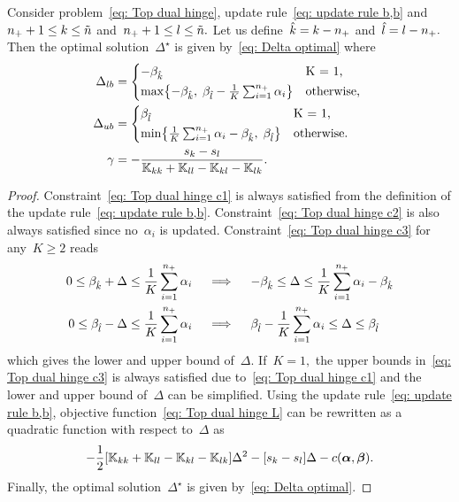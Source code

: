 \begin{lemma}
  Consider problem~\eqref{eq: Top dual hinge}, update rule~\eqref{eq: update rule b,b} and~$n_{+} + 1 \leq k \leq \tilde{n}$ and~$n_{+} + 1 \leq l \leq \tilde{n}.$ Let us define~$\hat{k} = k - n_{+}$ and~$\hat{l} = l - n_{+}.$ Then the optimal solution~$\Delta^{\star}$ is given by~\eqref{eq: Delta optimal} where
  \begin{align*}
    \Delta_{lb} & = 
      \begin{cases*}
        - \betak & K = 1, \\
        \max \Brac[c]{- \betak,\; \betal - \frac{1}{K} \sum_{i = 1}^{\npos} \alpha_i} & \textrm{otherwise},
      \end{cases*} \\
    \Delta_{ub} & = 
      \begin{cases*}
        \betal & K = 1, \\
        \min \Brac[c]{\frac{1}{K} \sum_{i = 1}^{\npos} \alpha_i - \betak,\; \betal} & \textrm{otherwise}.
      \end{cases*} \\
    \gamma & = -\frac{s_k - s_l}{\K_{kk} + \K_{ll} - \K_{kl} - \K_{lk}}.
  \end{align*}
\end{lemma}

\begin{proof}
  Constraint~\eqref{eq: Top dual hinge c1} is always satisfied from the definition of the update rule~\eqref{eq: update rule b,b}. Constraint~\eqref{eq: Top dual hinge c2} is also always satisfied since no~$\alpha_i$ is updated. Constraint~\eqref{eq: Top dual hinge c3} for any~$K \geq 2$ reads
  \begin{align*}
    0 \leq \beta_{\hat{k}} + \Delta \leq \frac{1}{K} \sum_{i = 1}^{n_{+}} \alpha_i 
    & \quad \implies \quad
    -\beta_{\hat{k}} \leq \Delta \leq \frac{1}{K} \sum_{i = 1}^{n_{+}} \alpha_i - \beta_{\hat{k}} \\
    0 \leq \beta_{\hat{l}} - \Delta \leq \frac{1}{K} \sum_{i = 1}^{n_{+}} \alpha_i
    & \quad \implies \quad
    \beta_{\hat{l}} - \frac{1}{K} \sum_{i = 1}^{n_{+}} \alpha_i \leq \Delta \leq \beta_{\hat{l}}
  \end{align*}
  which gives the lower and upper bound of~$\Delta.$ If~$K = 1,$ the upper bounds in~\eqref{eq: Top dual hinge c3} is always satisfied due to~\eqref{eq: Top dual hinge c1} and the lower and upper bound of~$\Delta$ can be simplified. Using the update rule~\eqref{eq: update rule b,b}, objective function~\eqref{eq: Top dual hinge L} can be rewritten as a quadratic function with respect to~$\Delta$ as
  \begin{equation*}
    - \frac{1}{2} \Brac[s]{\K_{kk} + \K_{ll} - \K_{kl} - \K_{lk}} \Delta^2
    - \Brac[s]{s_k - s_l} \Delta
    - c(\bm{\alpha}, \bm{\beta}).
  \end{equation*}
  Finally, the optimal solution~$\Delta^{\star}$ is given by~\eqref{eq: Delta optimal}.
\end{proof}

